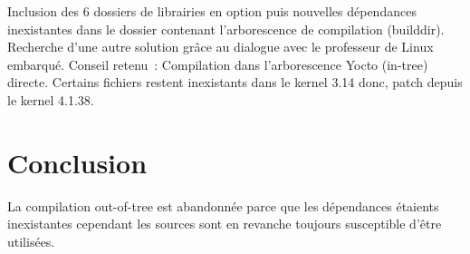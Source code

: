  \clearpage

Inclusion des 6 dossiers de librairies en option puis nouvelles dépendances
inexistantes dans le dossier contenant l’arborescence de compilation (builddir).
Recherche d’une autre solution grâce au dialogue avec le professeur de Linux
embarqué. Conseil retenu : Compilation dans l’arborescence Yocto (in-tree)
directe. Certains fichiers restent inexistants dans le kernel 3.14 donc,
patch depuis le kernel 4.1.38.

\section{Conclusion}

La compilation out-of-tree est abandonnée parce que les dépendances étaients
inexistantes cependant les sources sont en revanche toujours susceptible d’être utilisées.
